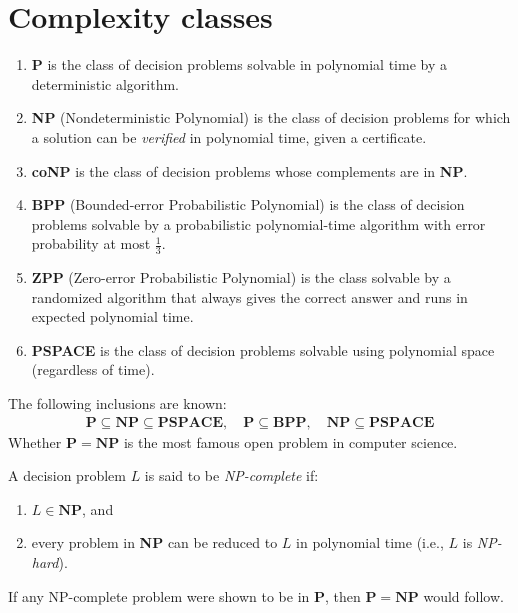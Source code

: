 \documentclass[a4paper, 12pt]{book} %
\begin{document}
\section{Complexity classes}

\begin{definition}
    \begin{enumerate}
        \item \textbf{P} is the class of decision problems solvable in polynomial time by a deterministic algorithm.
        \item \textbf{NP} (Nondeterministic Polynomial) is the class of decision problems for which a solution can be \emph{verified} in polynomial time, given a certificate.
        \item \textbf{coNP} is the class of decision problems whose complements are in \textbf{NP}.
        \item \textbf{BPP} (Bounded-error Probabilistic Polynomial) is the class of decision problems solvable by a probabilistic polynomial-time algorithm with error probability at most $\tfrac{1}{3}$.
        \item \textbf{ZPP} (Zero-error Probabilistic Polynomial) is the class solvable by a randomized algorithm that always gives the correct answer and runs in expected polynomial time.
        \item \textbf{PSPACE} is the class of decision problems solvable using polynomial space (regardless of time).
    \end{enumerate}
\end{definition}

\begin{theorem}
    The following inclusions are known:
    \begin{align}
        \mathbf{P} \subseteq \mathbf{NP} \subseteq \mathbf{PSPACE}, \quad \mathbf{P} \subseteq \mathbf{BPP}, \quad \mathbf{NP} \subseteq \textbf{PSPACE}
    \end{align}
    Whether $\mathbf{P} = \mathbf{NP}$ is the most famous open problem in computer science.
\end{theorem}

\begin{definition}
    A decision problem $L$ is said to be \emph{NP-complete} if:
    \begin{enumerate}
        \item $L \in \mathbf{NP}$, and
        \item every problem in \textbf{NP} can be reduced to $L$ in polynomial time (i.e., $L$ is \emph{NP-hard}).
    \end{enumerate}
    If any NP-complete problem were shown to be in \textbf{P}, then $\mathbf{P} = \mathbf{NP}$ would follow.
\end{definition}
\end{document}
